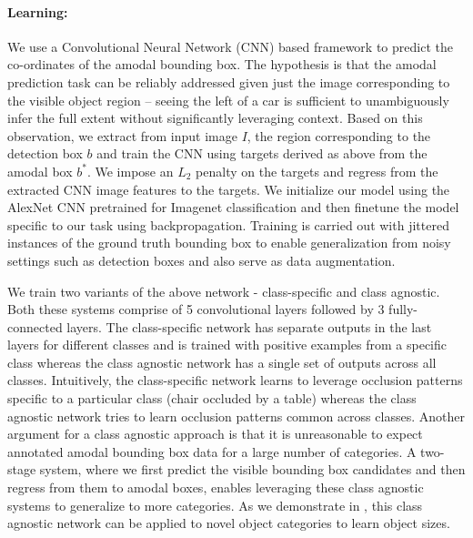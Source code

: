 \paragraph{Learning:} We use a Convolutional Neural Network (CNN) \cite{neocognitron,Lecun89} based framework to predict the co-ordinates of the amodal bounding box. The hypothesis is that the amodal prediction task can be reliably addressed given just the image corresponding to the visible object region -- seeing the left of a car is sufficient to unambiguously infer the full extent without significantly leveraging context. Based on this observation, we extract from input image $I$, the region corresponding to the detection box $b$ and train the CNN using targets derived as above from the amodal box $b^*$. We impose an $L_2$ penalty on the targets and regress from the extracted CNN image features to the targets. We initialize our model using the AlexNet \cite{krizhevsky2012imagenet} CNN pretrained for Imagenet \cite{imagenet_cvpr09} classification and then finetune the model specific to our task using backpropagation. Training is carried out with jittered instances of the ground truth bounding box to enable generalization from noisy settings such as detection boxes and also serve as data augmentation.

We train two variants of the above network - class-specific and class agnostic. Both these systems comprise of 5 convolutional layers followed by 3 fully-connected layers. The class-specific network has separate outputs in the last layers for different classes and is trained with positive examples from a specific class whereas the class agnostic network has a single set of outputs across all classes. Intuitively, the class-specific network learns to leverage occlusion patterns specific to a particular class (\eg chair occluded by a table) whereas the class agnostic network tries to learn occlusion patterns common across classes. Another argument for a class agnostic approach is that it is unreasonable to expect annotated amodal bounding box data for a large number of categories. A two-stage system, where we first predict the visible bounding box candidates and then regress from them to amodal boxes, enables leveraging these class agnostic systems to generalize to more categories. As we demonstrate in , this class agnostic network can be applied to novel object categories to learn object sizes.

